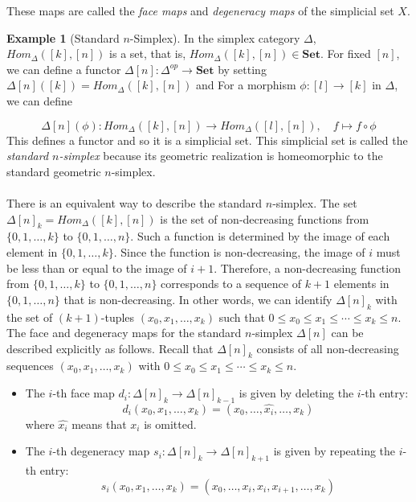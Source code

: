 \documentclass[11pt]{article}
\theoremstyle{definition}
\newtheorem{example}[definition]{Example}
\theoremstyle{plain}
\begin{document}
These maps are called the \emph{face maps} and \emph{degeneracy maps} of the simplicial set $X$.







\begin{example}[Standard $n$-Simplex]
    In the simplex category $\Delta$, $Hom_\Delta([k],[n])$ is a set, that is,
    $Hom_\Delta([k],[n]) \in \mathbf{Set}$.
    For fixed $[n]$, we can define a functor $\Delta[n] : \Delta^{op} \to \mathbf{Set}$ by setting $\Delta[n]([k]) = Hom_\Delta([k],[n])$ and
    For a morphism $\phi : [l] \to [k]$ in $\Delta$, we can define

    \[
        \Delta[n](\phi) : Hom_\Delta([k],[n]) \to Hom_\Delta([l],[n]), \quad f \mapsto f \circ \phi
    \]
    This defines a  functor and so it is a simplicial set.  This simplicial set is called the \emph{standard $n$-simplex} because its geometric realization is homeomorphic to the standard geometric $n$-simplex.

    \paragraph{}
    There is an equivalent way to describe the standard $n$-simplex. The set $\Delta[n]_k = Hom_\Delta([k],[n])$ is the set of non-decreasing functions from $\{0,1,\dots,k\}$ to $\{0,1,\dots,n\}$. Such a function is determined by the image of each element in $\{0,1,\dots,k\}$. Since the function is non-decreasing, the image of $i$ must be less than or equal to the image of $i+1$. Therefore, a non-decreasing function from $\{0,1,\dots,k\}$ to $\{0,1,\dots,n\}$ corresponds to a sequence of $k+1$ elements in $\{0,1,\dots,n\}$ that is non-decreasing. In other words, we can identify $\Delta[n]_k$ with the set of $(k+1)$-tuples $(x_0,x_1,\dots,x_k)$ such that $0 \leq x_0 \leq x_1 \leq \cdots \leq x_k \leq n$.
    The face and degeneracy maps for the standard $n$-simplex $\Delta[n]$ can be described explicitly as follows. Recall that $\Delta[n]_k$ consists of all non-decreasing sequences $(x_0, x_1, \ldots, x_k)$ with $0 \leq x_0 \leq x_1 \leq \cdots \leq x_k \leq n$.

    \begin{itemize}
        \item The $i$-th face map $d_i : \Delta[n]_k \to \Delta[n]_{k-1}$ is given by deleting the $i$-th entry:
              \[
                  d_i(x_0, x_1, \ldots, x_k) = (x_0, \ldots, \widehat{x_i}, \ldots, x_k)
              \]
              where $\widehat{x_i}$ means that $x_i$ is omitted.

        \item The $i$-th degeneracy map $s_i : \Delta[n]_k \to \Delta[n]_{k+1}$ is given by repeating the $i$-th entry:
              \[
                  s_i(x_0, x_1, \ldots, x_k) = (x_0, \ldots, x_i, x_i, x_{i+1}, \ldots, x_k)
              \]
    \end{itemize}

\end{example}
\end{document}
